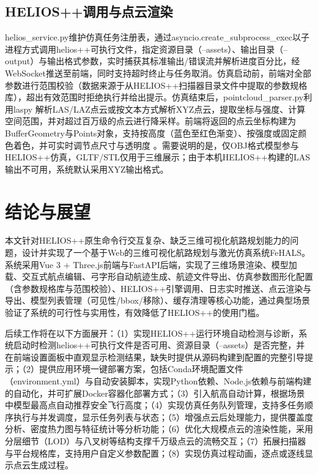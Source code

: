 \documentclass[a4paper,fleqn]{cas-sc}
\begin{document}
\subsection{HELIOS++调用与点云渲染}
helios\_service.py维护仿真任务注册表，通过asyncio.create\_subprocess\_exec以子进程方式调用helios++可执行文件，指定资源目录（--assets）、输出目录（--output）与输出格式参数，实时捕获其标准输出/错误流并解析进度百分比，经WebSocket推送至前端，同时支持超时终止与任务取消。仿真启动前，前端对全部参数进行范围校验（数据来源于从HELIOS++扫描器目录文件中提取的参数规格库），超出有效范围时拒绝执行并给出提示。仿真结束后，pointcloud\_parser.py利用laspy \citep{laspy} 解析LAS/LAZ点云或按文本方式解析XYZ点云，提取坐标与强度、计算空间范围，并对超过百万级的点云进行降采样。前端将返回的点云坐标构建为BufferGeometry与Points对象，支持按高度（蓝色至红色渐变）、按强度或固定颜色着色，并可实时调节点尺寸与透明度 \citep{pointCloudRendering}。需要说明的是，仅OBJ格式模型参与HELIOS++仿真，GLTF/STL仅用于三维展示；由于本机HELIOS++构建的LAS输出不可用，系统默认采用XYZ输出格式。

\section{结论与展望}\label{sec:conclusion}
本文针对HELIOS++原生命令行交互复杂、缺乏三维可视化航路规划能力的问题，设计并实现了一个基于Web的三维可视化航路规划与激光仿真系统FeHALS。系统采用Vue 3 + Three.js前端与FastAPI后端，实现了三维场景渲染、模型加载、交互式航点编辑、弓字形自动航迹生成、航迹文件导出、仿真参数图形化配置（含参数规格库与范围校验）、HELIOS++引擎调用、日志实时推送、点云渲染与导出、模型列表管理（可见性/bbox/移除）、缓存清理等核心功能，通过典型场景验证了系统的可行性与实用性，有效降低了HELIOS++的使用门槛。

后续工作将在以下方面展开：（1）实现HELIOS++运行环境自动检测与诊断，系统启动时检测helios++可执行文件是否可用、资源目录（--assets）是否完整，并在前端设置面板中直观显示检测结果，缺失时提供从源码构建到配置的完整引导提示；（2）提供应用环境一键部署方案，包括Conda环境配置文件（environment.yml）与自动安装脚本，实现Python依赖、Node.js依赖与前端构建的自动化，并可扩展Docker容器化部署方式；（3）引入航高自动计算，根据场景中模型最高点自动推荐安全飞行高度；（4）实现仿真任务队列管理，支持多任务顺序执行与并发调度，显示任务列表与状态；（5）增强点云后处理能力，提供覆盖度分析、密度热力图与特征统计等分析功能；（6）优化大规模点云的渲染性能，采用分层细节（LOD）与八叉树等结构支撑千万级点云的流畅交互；（7）拓展扫描器与平台规格库，支持用户自定义参数配置；（8）实现仿真过程动画，逐点或逐线显示点云生成过程。

\printcredits




\end{document}

